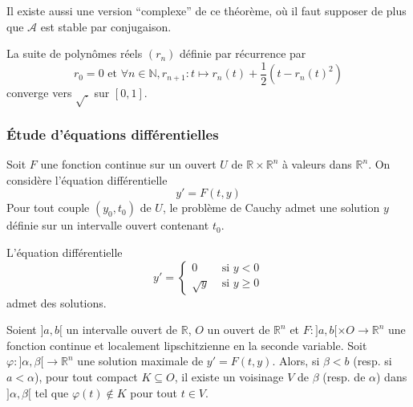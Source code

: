   \begin{remark}
    Il existe aussi une version ``complexe'' de ce théorème, où il faut supposer de plus que $\mathcal{A}$ est stable par conjugaison.
  \end{remark}

  \begin{example}
    La suite de polynômes réels $(r_n)$ définie par récurrence par
    \[ r_0 = 0 \text{ et } \forall n \in \mathbb{N}, r_{n+1} : t \mapsto r_n(t) + \frac{1}{2} (t - r_n(t)^2) \]
    converge vers $\sqrt{.}$ sur $[0,1]$.
  \end{example}

  \subsubsection{Étude d'équations différentielles}


  \begin{theorem}
    Soit $F$ une fonction continue sur un ouvert $U$ de $\mathbb{R} \times \mathbb{R}^n$ à valeurs dans $\mathbb{R}^n$. On considère l'équation différentielle
    \[ y' = F(t,y) \]
    Pour tout couple $(y_0, t_0)$ de $U$, le problème de Cauchy admet une solution $y$ définie sur un intervalle ouvert contenant $t_0$.
  \end{theorem}

  \begin{example}
    L'équation différentielle
    \[
    y' =
    \begin{cases}
      0 &\text{ si } y < 0 \\
      \sqrt{y} &\text{ si } y \geq 0
    \end{cases}
    \]
    admet des solutions.
  \end{example}


  \begin{theorem}
    Soient $]a,b[$ un intervalle ouvert de $\mathbb{R}$, $O$ un ouvert de $\mathbb{R}^n$ et $F : ]a,b[ \times O \rightarrow \mathbb{R}^n$ une fonction continue et localement lipschitzienne en la seconde variable. Soit $\varphi : ]\alpha,\beta[ \rightarrow \mathbb{R}^n$ une solution maximale de $y' = F(t,y)$.
    \newpar
    Alors, si $\beta < b$ (resp. si $a < \alpha$), pour tout compact $K \subseteq O$, il existe un voisinage $V$ de $\beta$ (resp. de $\alpha$) dans $]\alpha,\beta[$ tel que $\varphi(t) \notin K$ pour tout $t \in V$.
  \end{theorem}

